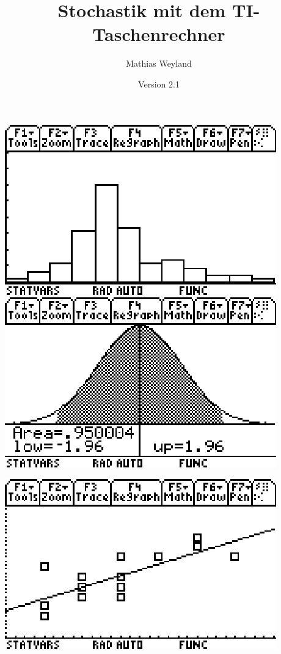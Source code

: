 \documentclass[a4paper,11pt,notitlepage,halfparskip,headsepline,normalheadings,twoside]{scrartcl}
\title{Stochastik mit dem TI-Taschenrechner}
\date{Version 2.1}
\author{Mathias Weyland}
\begin{document}
\maketitle

\begin{center}
\begin{multicols}{2}
\includegraphics{eps/titlepage1}
\columnbreak
\includegraphics{eps/titlepage2}
\end{multicols}
\includegraphics{eps/titlepage3}
\end{center}
\newpage
\end{document}
